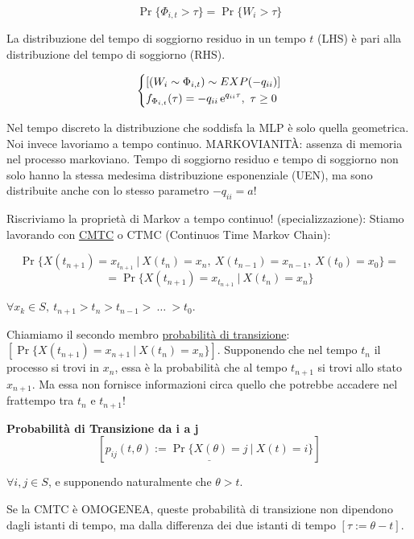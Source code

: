\begin{corl}

\[
	\Pr\{\Phi_{i,t} > \tau\} = \Pr\{W_i > \tau\}
\]

La distribuzione del tempo di soggiorno residuo in un tempo $t$ (LHS) è pari alla distribuzione del tempo di soggiorno (RHS). 

\[
	\left\{
	\begin{aligned}
	&[(W_i \sim \Phi_{i,t}) \sim EXP(-q_{ii})]\\
	&f_{\Phi_{i,t}}(\tau) = -q_{ii}\mathop{}\!\mathrm{e}^{q_{ii}\tau},\ \tau\geq 0
	\end{aligned}
	\right.
\]

\end{corl}

Nel tempo discreto la distribuzione che soddisfa la MLP è solo quella geometrica. Noi invece lavoriamo a tempo continuo. MARKOVIANIT\`A: assenza di memoria nel processo markoviano. Tempo di soggiorno residuo e tempo di soggiorno non solo hanno la stessa medesima distribuzione esponenziale (UEN), ma sono distribuite anche con lo stesso parametro $-q_{ii} = a$!

Riscriviamo la proprietà di Markov a tempo continuo! (specializzazione): Stiamo lavorando con \underline{CMTC} o CTMC (Continuos Time Markov Chain):

\[
	\Pr\{X(t_{n+1}) = x_{t_{n+1}}\ |\ X(t_n) = x_n,\ X(t_{n-1}) = x_{n-1},\ X(t_0) = x_0\} =
\]
\[
	= \Pr\{X(t_{n+1}) = x_{t_{n+1}}\ |\ X(t_n) = x_n\}
\]

$\forall x_k \in S,\ t_{n+1} > t_n > t_{n-1} >\ \dots\ > t_0$.

Chiamiamo il secondo membro \underline{probabilità di transizione}: $[\Pr\{X(t_{n+1}) = x_{n+1}\ |\ X(t_n) = x_n\}]$. Supponendo che nel tempo $t_n$ il processo si trovi in $x_n$, essa è la probabilità che al tempo $t_{n+1}$ si trovi allo stato $x_{n+1}$. Ma essa non fornisce informazioni circa quello che potrebbe accadere nel frattempo tra $t_n$ e $t_{n+1}$!

\begin{defn}{\textbf{Probabilità di Transizione da i a j}}
\[
	[\underline{p_{ij}(t,\theta) := \Pr\{X(\theta) = j\ |\ X(t) = i\}}]
\]
\end{defn}

$\forall i,j\in S$, e supponendo naturalmente che $\theta > t$.

Se la CMTC è OMOGENEA, queste probabilità di transizione non dipendono dagli istanti di tempo, ma dalla differenza dei due istanti di tempo $[\tau := \theta-t]$.

